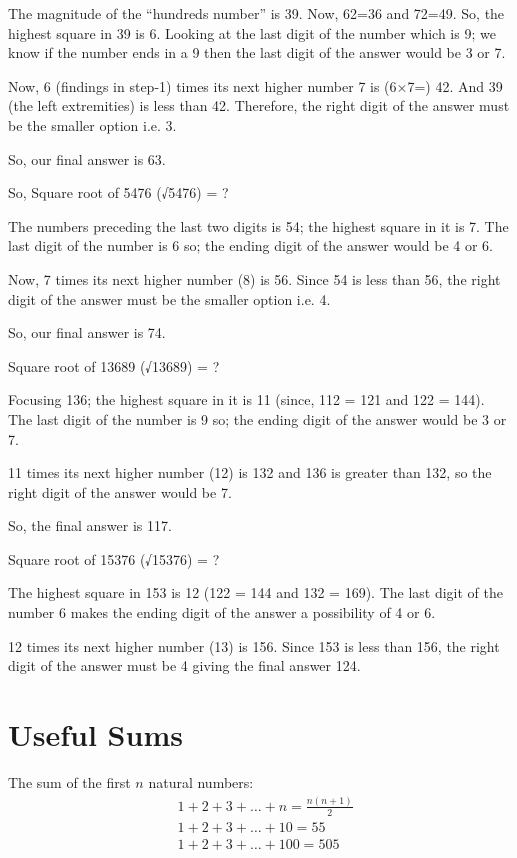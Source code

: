 \documentclass[12pt]{article}
\begin{document}
    The magnitude of the “hundreds number” is 39. Now, 62=36 and 72=49. So, the highest square in 39 is 6.
    Looking at the last digit of the number which is 9; we know if the number ends in a 9 then the last digit of the answer would be 3 or 7.

Now, 6 (findings in step-1) times its next higher number 7 is (6×7=) 42. And 39 (the left extremities) is less than 42. Therefore, the right digit of the answer must be the smaller option i.e. 3.

So, our final answer is 63.

So, Square root of 5476 (√5476) = ?

    The numbers preceding the last two digits is 54; the highest square in it is 7.
    The last digit of the number is 6 so; the ending digit of the answer would be 4 or 6.

Now, 7 times its next higher number (8) is 56. Since 54 is less than 56, the right digit of the answer must be the smaller option i.e. 4.

So, our final answer is 74.

Square root of 13689 (√13689) = ?

    Focusing 136; the highest square in it is 11 (since, 112 = 121 and 122 = 144).
    The last digit of the number is 9 so; the ending digit of the answer would be 3 or 7.

11 times its next higher number (12) is 132 and 136 is greater than 132, so the right digit of the answer would be 7.

So, the final answer is 117.

Square root of 15376 (√15376) = ?

    The highest square in 153 is 12 (122 = 144 and 132 = 169).
    The last digit of the number 6 makes the ending digit of the answer a possibility of 4 or 6.

12 times its next higher number (13) is 156. Since 153 is less than 156, the right digit of the answer must be 4 giving the final answer 124.

\section*{Useful Sums}
The sum of the first $n$ natural numbers:
\begin{align*}
& 1+2+3+\ldots+n = \frac{n(n+1)}{2} \\
& 1+2+3+\ldots+10 = 55 \\
& 1+2+3+\ldots+100 = 505
\end{align*}
\end{document}
